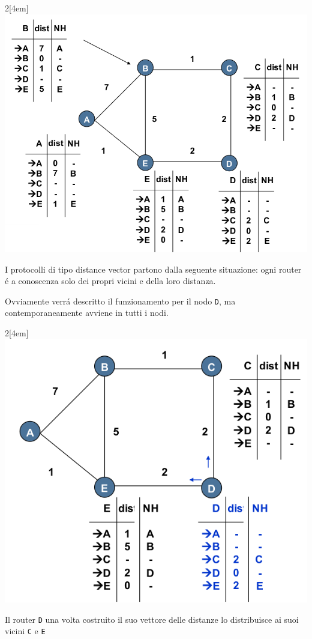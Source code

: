 \documentclass[12pt]{article}
\def\code#1{\texttt{#1}}
\begin{document}
\begin{multicols}{2}[\columnsep4em] 	
	\includegraphics[scale=0.3]{livello_di_rete-img8.png}
	\columnbreak
	
	I protocolli di tipo distance vector partono dalla seguente situazione: ogni router \'e a conoscenza solo dei propri 
	vicini e della loro distanza.
	
	Ovviamente verr\'a descritto il funzionamento per il nodo \code{D}, ma contemporaneamente avviene in tutti i nodi.
\end{multicols}
\begin{multicols}{2}[\columnsep4em] 	
	\includegraphics[scale=0.3]{livello_di_rete-img9.png}
	\columnbreak
	
	Il router \code{D} una volta costruito il suo vettore delle distanze lo distribuisce ai suoi vicini \code{C} e \code{E}
\end{multicols}
\end{document}
